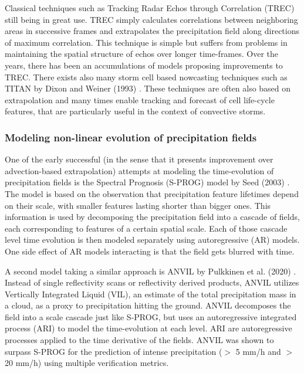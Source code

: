 Classical techniques such as Tracking Radar Echos through Correlation (TREC) \cite{rinehart_three-dimensional_1978} still being in great use. TREC simply calculates correlations between neighboring areas in successive frames and extrapolates the precipitation field along directions of maximum correlation. This technique is simple but suffers from problems in maintaining the spatial structure of echos over longer time-frames. Over the years, there has been an accumulations of models proposing improvements to TREC. There exists also many storm cell based nowcasting techniques such as TITAN by Dixon and Weiner (1993) \cite{dixon1993titan}. These techniques are often also based on extrapolation and many times enable tracking and forecast of cell life-cycle features, that are particularly useful in the context of convective storms. 

\subsubsection*{Modeling non-linear evolution of precipitation fields}

One of the early successful (in the sense that it presents improvement over advection-based extrapolation) attempts at modeling the time-evolution of precipitation fields is the Spectral Prognosis (S-PROG) model by Seed (2003) \cite{seed_dynamic_2003}. The model is based on the observation that precipitation feature lifetimes depend on their scale, with smaller features lasting shorter than bigger ones. This information is used by decomposing the precipitation field into a cascade of fields, each corresponding to features of a certain spatial scale. Each of those cascade level time evolution is then modeled separately using autoregressive (AR) models. One side effect of AR models interacting is that the field gets blurred with time. 

A second model taking a similar approach is ANVIL by Pulkkinen et al. (2020) \cite{pulkkinen_nowcasting_2020}. Instead of single reflectivity scans or reflectivity derived products, ANVIL utilizes Vertically Integrated Liquid (VIL), an estimate of the total precipitation mass in a cloud, as a proxy to precipitation hitting the ground. ANVIL decomposes the field into a scale cascade just like S-PROG, but uses an autoregressive integrated process (ARI) to model the time-evolution at each level. ARI are autoregressive processes applied to the time derivative of the fields. ANVIL was shown to surpass S-PROG for the prediction of intense precipitation ($>$ 5 mm/h and $>$ 20 mm/h) using multiple verification metrics. 


